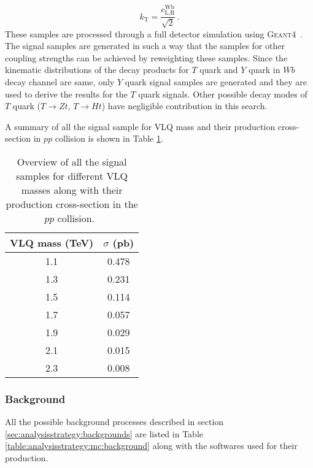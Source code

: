 \begin{equation}
	k_{\text{T}} = \frac{c_{\text{L,R}}^{\text{Wb}}}{\sqrt{2}} \,.
	\label{key}
\end{equation}
These samples are processed through a full detector simulation using \textsc{Geant4}~\cite{geant}. The signal samples are generated in such a way that the samples for other coupling strengths can be achieved by reweighting these samples. Since the kinematic distributions of the decay products for $T$ quark and $Y$ quark in $Wb$ decay channel are same, only $Y$ quark signal samples are generated and they are used to derive the results for the $T$ quark signals. Other possible decay modes of $T$ quark ($T\rightarrow Zt$, $T\rightarrow Ht$) have negligible contribution in this search.~\cite{vlqpaper} 

A summary of all the signal sample for VLQ mass and their production cross-section in $pp$ collision is shown in Table \ref{table:analysisstrategy:mc:signal}.

\begin{table}[hbt!]
	\centering
	\begin{tabular}{c | c} 
		\toprule
		VLQ mass (\si{\tera\electronvolt}) & $\sigma$ (\si{\pico\barn}) \\
		\midrule
		1.1 & \SI{0.478}{} \\
		1.3 & \SI{0.231}{} \\
		1.5 & \SI{0.114}{} \\ 
		1.7 & \SI{0.057}{} \\ 
		1.9 & \SI{0.029}{} \\ 
		2.1 & \SI{0.015}{} \\ 
		2.3 & \SI{0.008}{} \\ 
		\bottomrule
	\end{tabular}
	\caption{Overview of all the signal samples for different VLQ masses along with their production cross-section in the $pp$ collision.~\cite{wulzer}}
	\label{table:analysisstrategy:mc:signal}
\end{table}


\subsubsection{Background}%
\label{sec:analysisstrategy:mc:background}
 All the possible background processes described in section \ref{sec:analysisstrategy:backgrounds} are listed in Table \ref{table:analysisstrategy:mc:background} along with the softwares used for their production.
 
